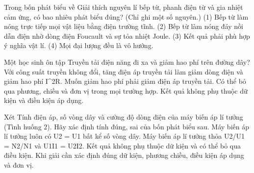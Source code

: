 \begin{ex}
Trong bốn phát biểu về Giải thích nguyên lí bếp từ, phanh điện từ và gia nhiệt cảm ứng, có bao nhiêu phát biểu đúng? (Chỉ ghi một số nguyên.) (1) Bếp từ làm nóng trực tiếp mọi vật liệu bằng điện trường tĩnh. (2) Bếp từ làm nóng đáy nồi dẫn điện nhờ dòng điện Foucault và sự tỏa nhiệt Joule. (3) Kết quả phải phù hợp ý nghĩa vật lí. (4) Mọi đại lượng đều là vô hướng.
\end{ex}

\begin{ex}
Một học sinh ôn tập Truyền tải điện năng đi xa và giảm hao phí trên đường dây?
\choice
{\True Với công suất truyền không đổi, tăng điện áp truyền tải làm giảm dòng điện và giảm hao phí I^2R.}
{Muốn giảm hao phí phải giảm điện áp truyền tải.}
{Có thể bỏ qua phương, chiều và đơn vị trong mọi trường hợp.}
{Kết quả không phụ thuộc dữ kiện và điều kiện áp dụng.}
\end{ex}

\begin{ex}
Xét Tính điện áp, số vòng dây và cường độ dòng điện của máy biến áp lí tưởng (Tình huống 2). Hãy xác định tính đúng, sai của bốn phát biểu sau.
\choiceTF
{Máy biến áp lí tưởng luôn có U2 = U1 bất kể số vòng dây.}
{\True Máy biến áp lí tưởng thỏa U2/U1 = N2/N1 và U1I1 = U2I2.}
{Kết quả không phụ thuộc dữ kiện và có thể bỏ qua điều kiện.}
{\True Khi giải cần xác định đúng dữ kiện, phương chiều, điều kiện áp dụng và đơn vị.}
\end{ex}

